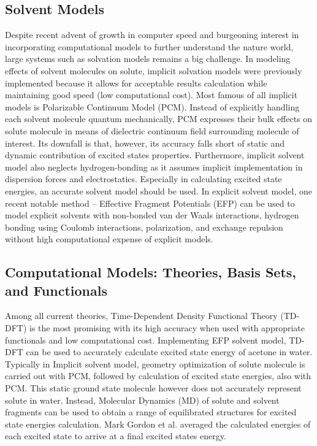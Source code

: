 \documentclass[
journal=jpcbfk, %
manuscript=article]{achemso}
\begin{document}
\subsection{Solvent Models}

Despite recent advent of growth in computer speed and burgeoning interest in incorporating computational models to further understand the nature world, large systems such as solvation models remains a big challenge.\cite{Lin2007} In modeling effects of solvent molecules on solute, implicit solvation models were previously implemented because it allows for acceptable results calculation while maintaining good speed (low computational cost). Most famous of all implicit models is Polarizable Continuum Model (PCM).\cite{Cossi2000} Instead of explicitly handling each solvent molecule quantum mechanically, PCM expresses their bulk effects on solute molecule in means of dielectric continuum field surrounding molecule of interest. Its downfall is that, however, its accuracy falls short of static and dynamic contribution of excited states properties.\cite{Barone2007} Furthermore, implicit solvent model also neglects hydrogen-bonding as it assumes implicit implementation in dispersion forces and electrostatics.\cite{Li1999} Especially in calculating excited state energies, an accurate solvent model should be used.\cite{Tomasi2005} In explicit solvent model, one recent notable method – Effective Fragment Potentials (EFP) can be used to model explicit solvents with non-bonded van der Waals interactions, hydrogen bonding using Coulomb interactions, polarization, and exchange repulsion without high computational expense of explicit models.\cite{Day1996,Yoo2008} 

\subsection{Computational Models: Theories, Basis Sets, and Functionals}

Among all current theories, Time-Dependent Density Functional Theory (TD-DFT) is the most promising with its high accuracy when used with appropriate functionals and low computational cost\cite{Magyar2007}. Implementing EFP solvent model, TD-DFT can be used to accurately calculate excited state energy of acetone in water.\cite{Yoo2008} Typically in Implicit solvent model, geometry optimization of solute molecule is carried out with PCM, followed by calculation of excited state energies, also with PCM. This static ground state molecule however does not accurately represent solute in water.\cite{Defusco2011} Instead, Molecular Dynamics (MD) of solute and solvent fragments can be used to obtain a range of equilibrated structures for excited state energies calculation. Mark Gordon et al. averaged the calculated energies of each excited state to arrive at a final excited states energy.\cite{Defusco2011}
\end{document}
